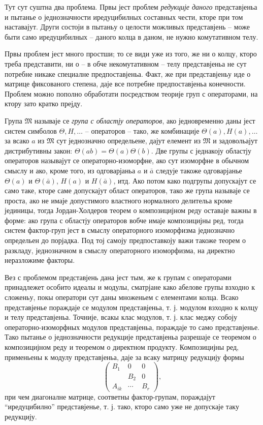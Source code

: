 ﻿\documentclass[11pt]{article}
\begin{document}
Тут сут суштна два проблема. Првы јест проблем \emph{редукције даного} представјеньа и пытанье о једнозначности иредуцибилных составных чести, кторе при том наставајут. Други состоји в пытаньу о целости можливых представјень -- може быти само иредуцибилных -- даного колца в даном, не нужно комутативном телу.

Првы проблем јест много простши; то се види уже из того, же ни о колцу, кторо треба представити, ни о -- в обче некомутативном -- телу представјеньа не сут потребне никаке специалне предпоставјеньа. Факт, же при представјеньу иде о матрице фиксованого степена, даје все потребне предпоставјеньа конечности. Проблем можно пополно обработати посредством теорије груп с операторами, на ктору зато кратко прејду.

Група $\mathfrak{M}$ называје се \emph{група с областју операторов}, ако једновременно даны јест систем симболов $\Theta,H,\ldots$ -- операторов -- тако, же комбинације $\Theta(a),H(a),\ldots$ за всако $a$ из $\mathfrak{M}$ сут једнозначно определьене, дајут елемент из $\mathfrak{M}$ и задовольајут дистрибутивны закон: $\Theta(ab)=\Theta(a)\Theta(b)$. Две групы с једнакоју областју операторов называјут се операторно-изоморфне, ако сут изоморфне в обычном смыслу и ако, кроме того, из одговарјаньа $a$ и $\bar a$ следује такоже одговарјанье $\Theta(a)$ и $\Theta(\bar a)$, $H(a)$ и $H(\bar a)$, итд. Ако потом како подгрупы допускајут се само таке, кторе саме допускајут област операторов, тако же група называје се проста, ако не имаје допустимого властного нормалного делительа кроме јединицы, тогда Јордан-Холдеров теорем о композицијном реду оставаје важны в форме: ако група с областју операторов вобче имаје композицијны ред, тогда систем фактор-груп јест в смыслу операторного изоморфизма једнозначно определьен до порјадка. Под тој самоју предпоставкоју важи такоже теорем о разкладу, једнозначном в смыслу операторного изоморфизма, на директно неразложиме факторы.

Вез с проблемом представјень дана јест тым, же к групам с операторами принадлежет особито идеалы и модулы, сматрјане како абелове групы взходно к сложеньу, покы оператори сут даны множеньем с елементами колца. Всако представјенье пораждаје се модулом представјеньа, т. ј. модулом взходно к колцу и телу представјеньа. Точније, всакы клас модулов, т. ј. клас меджу собоју операторно-изоморфных модулов представјеньа, пораждаје то само представјенье. Тако пытанье о једнозначности редукције представјеньа разрешаје се теоремом о композицијном реду и теоремом о директном продукту. Композицијны ред, применьены к модулу представјеньа, даје за всаку матрицу редукцију формы
\[
\begin{pmatrix}
B_1&0&0\\
&B_2&0\\
A_{ik}&\cdots&B_r
\end{pmatrix},
\]
при чем диагоналне матрице, соответны фактор-групам, пораждајут “иредуцибилно” представјенье, т. ј. тако, кторо само уже не допускаје таку редукцију.
\end{document}
